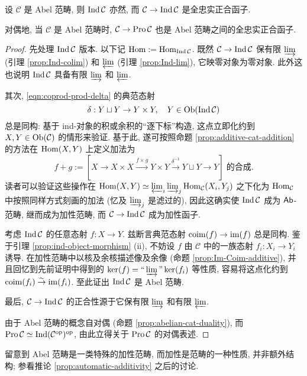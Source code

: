 \begin{theorem}\label{prop:Ind-Abel}
	设 $\mathcal{C}$ 是 Abel 范畴, 则 $\operatorname{Ind}\mathcal{C}$ 亦然, 而 $\mathcal{C} \to \operatorname{Ind}\mathcal{C}$ 是全忠实正合函子.
	
	对偶地, 当 $\mathcal{C}$ 是 Abel 范畴时, $\mathcal{C} \to \operatorname{Pro}\mathcal{C}$ 也是 Abel 范畴之间的全忠实正合函子.
\end{theorem}
\begin{proof}
	先处理 $\operatorname{Ind}\mathcal{C}$ 版本. 以下记 $\operatorname{Hom} := \operatorname{Hom}_{\operatorname{Ind}\mathcal{C}}$. 既然 $\mathcal{C} \to \operatorname{Ind}\mathcal{C}$ 保有限 $\varinjlim$ (引理 \ref{prop:Ind-colim}) 和 $\varprojlim$ (引理 \ref{prop:Ind-lim}), 它映零对象为零对象. 此外这也说明 $\operatorname{Ind}\mathcal{C}$ 具备有限 $\varinjlim$ 和 $\varprojlim$.
	
	其次, \eqref{eqn:coprod-prod-delta} 的典范态射
	\[ \delta: Y \sqcup Y \to Y \times Y, \quad Y \in \operatorname{Ob}(\operatorname{Ind}\mathcal{C}) \]
	总是同构: 基于 ind-对象的积或余积的``逐下标''构造, 这点立即化约到 $X, Y \in \operatorname{Ob}(\mathcal{C})$ 的情形来验证. 基于此, 遂可按照命题 \ref{prop:additive-cat-addition} 的方法在 $\operatorname{Hom}(X, Y)$ 上定义加法为
	\[ f+g := \left[ X \to X \times X \xrightarrow{f \times g} Y \times Y \xrightarrow{\delta^{-1}} Y \sqcup Y \to Y \right]\;\text{的合成}. \]
	读者可以验证这些操作在 $\operatorname{Hom}(X, Y) \simeq \varprojlim_i \varinjlim_j \operatorname{Hom}_{\mathcal{C}}(X_i, Y_j)$ 之下化为 $\operatorname{Hom}_{\mathcal{C}}$ 中按照同样方式刻画的加法 (忆及 $\varinjlim_j$ 是滤过的), 因此这确实使 $\operatorname{Ind}\mathcal{C}$ 成为 $\mathsf{Ab}$-范畴, 继而成为加性范畴, 而 $\mathcal{C} \to \operatorname{Ind}\mathcal{C}$ 成为加性函子.
	
	考虑 $\operatorname{Ind}\mathcal{C}$ 的任意态射 $f: X \to Y$. 兹断言典范态射 $\operatorname{coim}(f) \to \operatorname{im}(f)$ 总是同构. 鉴于引理 \ref{prop:ind-object-morphism} (ii), 不妨设 $f$ 由 $\mathcal{C}$ 中的一族态射 $f_i: X_i \to Y_i$ 诱导. 在加性范畴中以核及余核描述像及余像 (命题 \ref{prop:Im-Coim-additive}), 并且回忆到先前证明中得到的 $\Ker(f) = \Yinjlim \Ker(f_i)$ 等性质, 容易将这点化约到 $\operatorname{coim}(f_i) \stackrel{\sim}{\rightarrow} \operatorname{im}(f_i)$. 至此证出 $\operatorname{Ind}\mathcal{C}$ 是 Abel 范畴.
	
	最后, $\mathcal{C} \to \operatorname{Ind}\mathcal{C}$ 的正合性源于它保有限 $\varinjlim$ 和有限 $\varprojlim$.
	
	由于 Abel 范畴的概念自对偶 (命题 \ref{prop:abelian-cat-duality}), 而 $\operatorname{Pro}\mathcal{C} \simeq \operatorname{Ind}(\mathcal{C}^{\operatorname{op}})^{\operatorname{op}}$, 由此立得关于 $\operatorname{Pro}\mathcal{C}$ 的对偶表述.
\end{proof}

留意到 Abel 范畴是一类特殊的加性范畴, 而加性是范畴的一种性质, 并非额外结构; 参看推论 \ref{prop:automatic-additivity} 之后的讨论.

